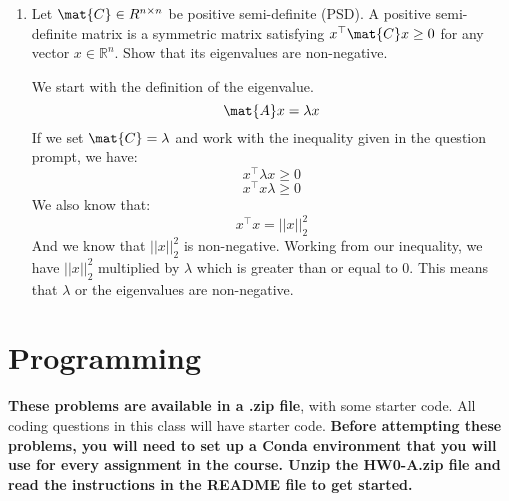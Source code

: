 \documentclass{article}
\begin{document}
\begin{aprob}
\begin{enumerate}
        \item {} Let $\mat{C} \in R^{n \times n}$ be positive semi-definite (PSD). A positive semi-definite matrix is a symmetric matrix satisfying $x^\top \mat{C} x \geq 0$ for any vector $x\in{\mathbb R}^n$. Show that its eigenvalues are non-negative.
        
        We start with the definition of the eigenvalue.
        $$\mat{A}x = \lambda x$$
        If we set $\mat{C} = \lambda$ and work with the inequality given in the question prompt, we have:
        $$x^\top \lambda x \geq 0$$
        $$x^\top x \lambda \geq 0$$
        We also know that:
        $$ x^\top x = ||x||_2^2$$
        And we know that $||x||_2^2$ is non-negative. Working from our inequality, we have $||x||_2^2$ multiplied by $\lambda$ which is greater than or equal to 0. This means that $\lambda$ or the eigenvalues are non-negative.
        
    \end{enumerate}
\end{aprob}

\noindent\makebox[\linewidth]{\rule{\textwidth}{0.4pt}}

\section*{Programming}
\textbf{These problems are  available in a .zip file}, with some starter code. All coding questions in this class will have starter code.
\textbf{Before attempting these problems, you will need to set up a Conda environment that you will use for every assignment in the course. Unzip the HW0-A.zip file and read the instructions in the README file to get started.}
\end{document}
